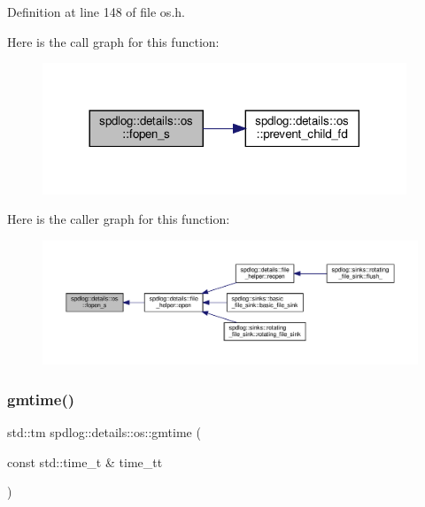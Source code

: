 Definition at line 148 of file os.\+h.

Here is the call graph for this function\+:
\nopagebreak
\begin{figure}[H]
\begin{center}
\leavevmode
\includegraphics[width=308pt]{namespacespdlog_1_1details_1_1os_af2d11a0b892e2f0cb3c6beba4c659a47_cgraph}
\end{center}
\end{figure}
Here is the caller graph for this function\+:
\nopagebreak
\begin{figure}[H]
\begin{center}
\leavevmode
\includegraphics[width=350pt]{namespacespdlog_1_1details_1_1os_af2d11a0b892e2f0cb3c6beba4c659a47_icgraph}
\end{center}
\end{figure}
\mbox{\label{namespacespdlog_1_1details_1_1os_ac993ad051e07cd5bda5328be2a54b0a8}} 
\subsubsection{\texorpdfstring{gmtime()}{gmtime()}\hspace{0.1cm}{\footnotesize\ttfamily [1/2]}}
{\footnotesize\ttfamily std\+::tm spdlog\+::details\+::os\+::gmtime (\begin{DoxyParamCaption}\item[{const std\+::time\+\_\+t \&}]{time\+\_\+tt }\end{DoxyParamCaption})\hspace{0.3cm}{\ttfamily [inline]}}




